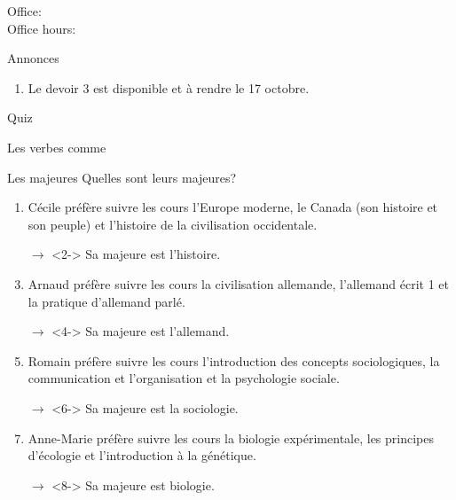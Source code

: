\documentclass{beamer}
\subtitle[Études et verbes \lexi{préférer}]{Vos études et les verbes comme \lexi{préférer}}
\begin{document}
  \begin{frame}
    \titlepage
    \tiny{Office: \\
          Office hours: }
  \end{frame}

  \begin{frame}{Annonces}
    \begin{center}
      \begin{enumerate}
        \item Le devoir 3 est disponible et à rendre le 17 octobre.
        \item[] 
      \end{enumerate}
    \end{center}
  \end{frame}

  \begin{frame}{}
    \begin{center}
      \Large Quiz
    \end{center}
  \end{frame}

  \begin{frame}{Les verbes comme }
    \begin{center}
      
    \end{center}
  \end{frame}

  \begin{frame}{Les majeures}
    Quelles sont leurs majeures?
    \begin{enumerate}
      \item Cécile préfère suivre les cours l'Europe moderne, le Canada (son histoire et son peuple) et l'histoire de la civilisation occidentale.
      \item[$\to$]<2-> Sa majeure est l'histoire.
      \item<3-> Arnaud préfère suivre les cours la civilisation allemande, l'allemand écrit 1 et la pratique d'allemand parlé.
      \item[$\to$]<4-> Sa majeure est l'allemand.
      \item<5-> Romain préfère suivre les cours l'introduction des concepts sociologiques, la communication et l'organisation et la psychologie sociale.
      \item[$\to$]<6-> Sa majeure est la sociologie.
      \item<7-> Anne-Marie préfère suivre les cours la biologie expérimentale, les principes d'écologie et l'introduction à la génétique.
      \item[$\to$]<8-> Sa majeure est biologie.
    \end{enumerate}
  \end{frame}
\end{document}
